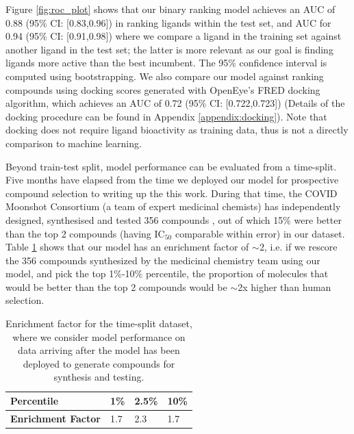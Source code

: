 Figure \ref{fig:roc_plot} shows that our binary ranking model achieves an AUC of 0.88 (95\% CI: [0.83,0.96]) in ranking ligands within the test set, and AUC for 0.94 (95\% CI: [0.91,0.98]) where we compare a ligand in the training set against another ligand in the test set; the latter is more relevant as our goal is finding ligands more active than the best incumbent. The 95\% confidence interval is computed using bootstrapping. We also compare our model against ranking compounds using docking scores generated with OpenEye's FRED docking algorithm, which achieves an AUC of 0.72 (95\% CI: [0.722,0.723]) (Details of the docking procedure can be found in Appendix \ref{appendix:docking}). Note that docking does not require ligand bioactivity as training data, thus is not a directly comparison to machine learning.


Beyond train-test split, model performance can be evaluated from a time-split. Five months have elapsed from the time we deployed our model for prospective compound selection to writing up the this work. During that time, the COVID Moonshot Consortium (a team of expert medicinal chemists) has independently designed, synthesised and tested 356 compounds \cite{moonshot2020covid}, out of which 15\% were better than the top 2 compounds (having $\mathrm{IC}_{50}$ comparable within error) in our dataset. Table \ref{table:time_split} shows that our model has an enrichment factor of $\sim$2, i.e. if we rescore the 356 compounds synthesized by the medicinal chemistry team using our model, and pick the top 1\%-10\% percentile, the proportion of molecules that would be better than the top 2 compounds would be $\sim$2x higher than human selection. 

\begin{table}[!bh]
    \centering
    \begin{tabular}{|l|l|l|l|}
    \hline
    \textbf{Percentile}        & 1\% & 2.5\% & 10\% \\ \hline
    \textbf{Enrichment Factor} & 1.7 & 2.3   & 1.7  \\ \hline
    \end{tabular}
    \caption{Enrichment factor for the time-split dataset, where we consider model performance on data arriving after the model has been deployed to generate compounds for synthesis and testing. }
    \label{table:time_split}
\end{table}

